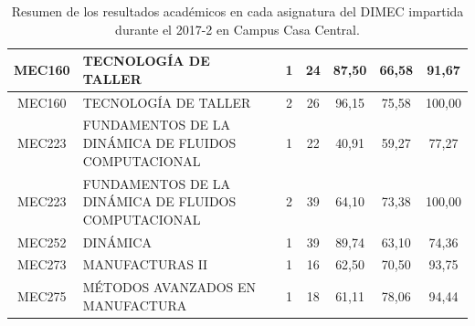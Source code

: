 \documentclass[12pt]{article}
\begin{document}
\begin{table}[H]
{\begin{tabular}{|c|l|c|c|c|c|c|}
\rowcolor[HTML]{DAEBFB} 
MEC160 & TECNOLOGÍA DE TALLER & 1 & 24 & 87,50 & 66,58 & 91,67 \\ \hline
\rowcolor[HTML]{DAEBFB} 
MEC160 & TECNOLOGÍA DE TALLER & 2 & 26 & 96,15 & 75,58 & 100,00 \\ \hline
\rowcolor[HTML]{DAEBFB} 
MEC223 & FUNDAMENTOS DE LA DINÁMICA DE FLUIDOS COMPUTACIONAL & 1 & 22 & 40,91 & 59,27 & 77,27 \\ \hline
\rowcolor[HTML]{DAEBFB} 
MEC223 & FUNDAMENTOS DE LA DINÁMICA DE FLUIDOS COMPUTACIONAL & 2 & 39 & 64,10 & 73,38 & 100,00 \\ \hline
\rowcolor[HTML]{DAEBFB} 
MEC252 & DINÁMICA & 1 & 39 & 89,74 & 63,10 & 74,36 \\ \hline
\rowcolor[HTML]{DAEBFB} 
MEC273 & MANUFACTURAS II & 1 & 16 & 62,50 & 70,50 & 93,75 \\ \hline
\rowcolor[HTML]{DAEBFB} 
MEC275 & MÉTODOS AVANZADOS EN MANUFACTURA & 1 & 18 & 61,11 & 78,06 & 94,44 \\ \hline
\end{tabular}}
\caption{Resumen de los resultados académicos en cada asignatura del DIMEC impartida durante el 2017-2 en Campus Casa Central.}
\label{table:resumenCC}
\end{table}
\end{document}
